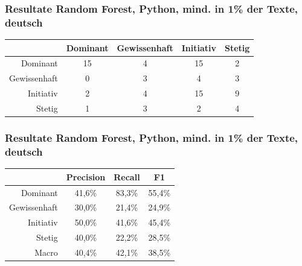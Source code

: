 \documentclass{beamer}
\begin{document}
\begin{frame}
\frametitle{Resultate Random Forest, Python, mind. in 1\% der Texte, deutsch}
\begin{center}
\begin{tabular}{r|c|c|c|c|}
 &  Dominant  & Gewissenhaft & Initiativ & Stetig\\
\hline
Dominant & 15 & 4 & 15 & 2 \\
Gewissenhaft & 0 & 3 & 4 & 3\\
Initiativ & 2 & 4 & 15 & 9\\
Stetig & 1 & 3 & 2 & 4
\end{tabular}
\end{center}
\end{frame}
\begin{frame}
\frametitle{Resultate Random Forest, Python, mind. in 1\% der Texte, deutsch}
\begin{center}
\begin{tabular}{r|c|c|c|}
 &  Precision  & Recall & F1 \\
\hline
Dominant     & 41,6\% & 83,3\% & 55,4\% \\
Gewissenhaft & 30,0\% & 21,4\% & 24,9\% \\
Initiativ    & 50,0\% & 41,6\% & 45,4\% \\
Stetig       & 40,0\% & 22,2\% & 28,5\% \\
\hline
Macro        & 40,4\% & 42,1\% & 38,5\%
\end{tabular}
\end{center}
\end{frame}

\end{document}
